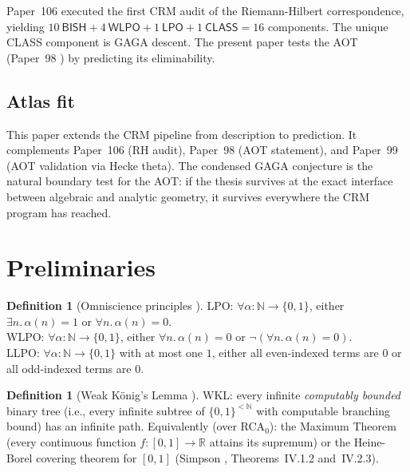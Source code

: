 \documentclass[11pt,a4paper]{article}
\theoremstyle{plain}
\theoremstyle{definition}
\newtheorem{definition}[theorem]{Definition}
\newcommand{\BISH}{\textsf{BISH}}
\newcommand{\WKL}{\textsf{WKL}}
\newcommand{\WLPO}{\textsf{WLPO}}
\newcommand{\LLPO}{\textsf{LLPO}}
\newcommand{\LPO}{\textsf{LPO}}
\newcommand{\CLASS}{\textsf{CLASS}}
\newcommand{\R}{\mathbb{R}}
\newcommand{\N}{\mathbb{N}}
\begin{document}
Paper~106 \cite{Paper106} executed the first CRM audit of the Riemann-Hilbert correspondence, yielding $10\ \BISH + 4\ \WLPO + 1\ \LPO + 1\ \CLASS = 16$ components.
The unique \CLASS{} component is GAGA descent.
The present paper tests the AOT (Paper~98 \cite{Paper98}) by predicting its eliminability.

\subsection{Atlas fit}

This paper extends the CRM pipeline from description to prediction.
It complements Paper~106 (RH audit), Paper~98 (AOT statement), and Paper~99 (AOT validation via Hecke theta).
The condensed GAGA conjecture is the natural boundary test for the AOT: if the thesis survives at the exact interface between algebraic and analytic geometry, it survives everywhere the CRM program has reached.

\section{Preliminaries}
\label{sec:prelim}

\begin{definition}[Omniscience principles {\cite{BridgesRichman1987}}]\label{def:omniscience}
\LPO: $\forall \alpha : \N \to \{0,1\}$, either $\exists n.\, \alpha(n) = 1$ or $\forall n.\, \alpha(n) = 0$.\\
\WLPO: $\forall \alpha : \N \to \{0,1\}$, either $\forall n.\, \alpha(n) = 0$ or $\lnot(\forall n.\, \alpha(n) = 0)$.\\
\LLPO: $\forall \alpha : \N \to \{0,1\}$ with at most one $1$, either all even-indexed terms are $0$ or all odd-indexed terms are $0$.
\end{definition}

\begin{definition}[Weak König's Lemma {\cite{Simpson2009}}]\label{def:wkl}
\WKL: every infinite \emph{computably bounded} binary tree (i.e., every infinite subtree of $\{0,1\}^{<\N}$ with computable branching bound) has an infinite path.
Equivalently (over RCA$_0$): the Maximum Theorem (every continuous function $f : [0,1] \to \R$ attains its supremum) or the Heine-Borel covering theorem for $[0,1]$ (Simpson \cite{Simpson2009}, Theorems~IV.1.2 and~IV.2.3).
\end{definition}
\end{document}
